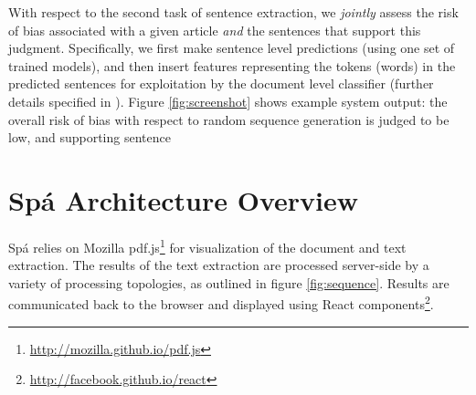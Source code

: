 \documentclass[runningheads,a4paper]{llncs}
\begin{document}
With respect to the second task of sentence extraction, we \emph{jointly} assess the risk of bias associated with a given article \emph{and} the sentences that support this judgment.
Specifically, we first make sentence level predictions (using one set of trained models), and then insert features representing the tokens (words) in the predicted sentences for exploitation by the document level classifier (further details specified in \cite{marshall2014}).
Figure \ref{fig:screenshot} shows example system output: the overall risk of bias with respect to random sequence generation is judged to be low, and supporting sentence



\section{Spá Architecture Overview}
Spá relies on Mozilla pdf.js\footnote{\url{http://mozilla.github.io/pdf.js}} for visualization of the document and text extraction.
The results of the text extraction are processed server-side by a variety of processing topologies, as outlined in figure \ref{fig:sequence}.
Results are communicated back to the browser and displayed using React components\footnote{\url{http://facebook.github.io/react}}.
\end{document}

